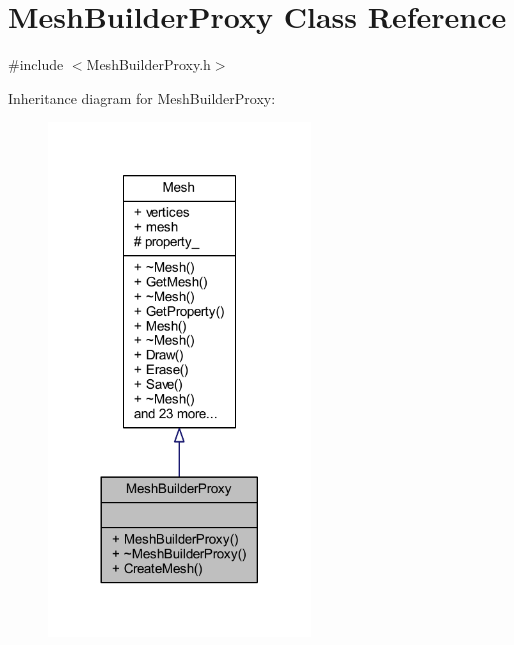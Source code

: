 \hypertarget{class_mesh_builder_proxy}{}\section{Mesh\+Builder\+Proxy Class Reference}
\label{class_mesh_builder_proxy}


{\ttfamily \#include $<$Mesh\+Builder\+Proxy.\+h$>$}



Inheritance diagram for Mesh\+Builder\+Proxy\+:\nopagebreak
\begin{figure}[H]
\begin{center}
\leavevmode
\includegraphics[width=197pt]{class_mesh_builder_proxy__inherit__graph}
\end{center}
\end{figure}


